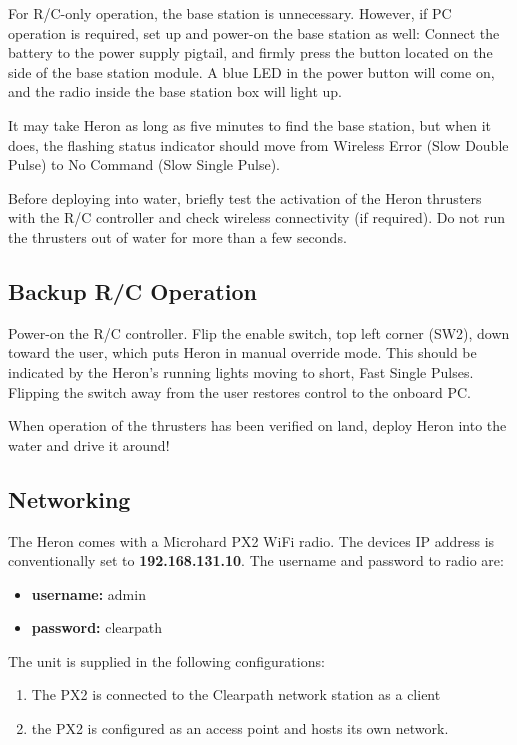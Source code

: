 \documentclass[]{clearpath-latex/clearpath-manual}
\begin{document}
For R/C-only operation, the base station is unnecessary. However, if PC operation is required, set up and power-on the base station as well: Connect the battery to the power supply pigtail, and firmly press the button located on the side of the base station module. A blue LED in the power button will come on, and the radio inside the base station box will light up.

It may take Heron as long as five minutes to find the base station, but when it does, the flashing status indicator should move from Wireless Error (Slow Double Pulse) to No Command (Slow Single Pulse).

Before deploying into water, briefly test the activation of the Heron thrusters with the R/C controller and check wireless connectivity (if required). Do not run the thrusters out of water for more than a few seconds.

\subsection{Backup R/C Operation} \label{backupoperation}
Power-on the R/C controller. Flip the enable switch, top left corner (SW2), down toward the user, which puts Heron in manual override mode. This should be indicated by the Heron's running lights moving to short, Fast Single Pulses. Flipping the switch away from the user restores control to the onboard PC.

When operation of the thrusters has been verified on land, deploy Heron into the water and drive it around!

\subsection{Networking}

The Heron comes with a Microhard PX2 WiFi radio. The devices IP address is conventionally set to \textbf{192.168.131.10}.
The username and password to radio are:
\begin{itemize}
\item \textbf{username:} admin
\item \textbf{password:} clearpath
\end{itemize}


 The unit is supplied in the following configurations:

\begin{enumerate}
\item The PX2 is connected to the Clearpath network station as a client
\item the PX2 is configured as an access point and hosts its own network.
\end{enumerate}
\end{document}

